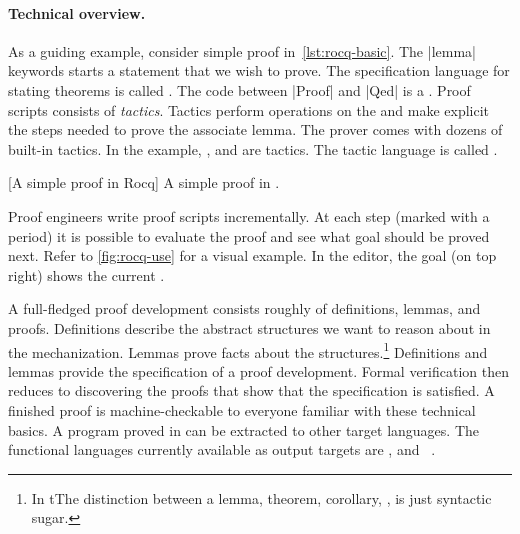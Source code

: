 \paragraph*{Technical overview.}
As a guiding example, consider simple proof in~\autoref{lst:rocq-basic}. The
\pr|lemma| keywords starts a statement that we wish to prove. The specification
language for stating theorems is called . The code between
\pr|Proof| and \pr|Qed| is a \emph{}. Proof scripts consists
of \emph{tactics}. Tactics perform operations on the
\emph{} and make explicit the steps needed to prove the
associate lemma. The  prover comes with dozens of built-in
tactics. In the example, ,  and
 are tactics. The tactic language is
called .

\begin{center}
\begin{minipage}{\textwidth}
\captionsetup{type=lstlisting}
[A simple proof in Rocq]{
   A simple proof in .}
\label{lst:rocq-basic}
\end{minipage}
\end{center}

Proof engineers write proof scripts incrementally. At each step (marked with a
period) it is possible to evaluate the proof and see what goal should be proved
next. Refer to \autoref{fig:rocq-use} for a visual example. In the editor, the
goal (on top right) shows the current .

A full-fledged proof development consists roughly of definitions, lemmas, and
proofs. Definitions describe the abstract structures we want to reason about in
the mechanization. Lemmas prove facts about the structures.\footnote{In
 tThe distinction between a lemma, theorem, corollary, \etc, is just
syntactic sugar.} Definitions and lemmas provide the
specification of a proof development. Formal
verification then reduces to discovering the proofs
that show that the specification is satisfied. A finished proof is
machine-checkable to everyone familiar with these technical basics. A program
proved in  can be extracted to other target languages. The functional
languages currently available as output targets are , 
and ~\cite{rocqdoc}.

